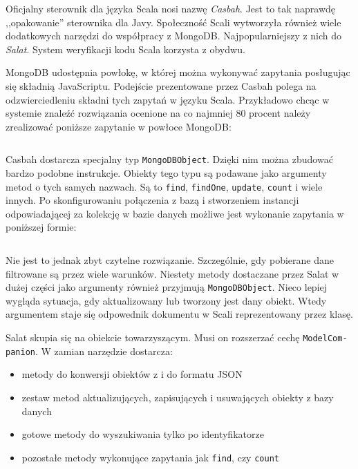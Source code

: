 \documentclass[wimgr]{xmgr}
\begin{document}
Oficjalny sterownik dla języka Scala nosi nazwę \emph{Casbah}. Jest to tak naprawdę ,,opakowanie'' sterownika dla Javy. Społeczność Scali wytworzyła również wiele dodatkowych narzędzi do współpracy z MongoDB. Najpopularniejszy z nich do \emph{Salat}. System weryfikacji kodu Scala korzysta z obydwu.

MongoDB udostępnia powłokę, w której można wykonywać zapytania posługując się składnią JavaScriptu. Podejście prezentowane przez Casbah polega na odzwierciedleniu składni tych zapytań w języku Scala.  
Przykładowo chcąc w systemie znaleźć rozwiązania ocenione na co najmniej 80 procent należy zrealizować poniższe zapytanie w powłoce MongoDB:

\inputminted[fontsize=\small]{javascript}{code/mongoFind.js}

Casbah dostarcza specjalny typ \texttt{MongoDBObject}. Dzięki nim można zbudować bardzo podobne instrukcje. Obiekty tego typu są podawane jako argumenty metod o tych samych nazwach. Są to \texttt{find}, \texttt{findOne}, \texttt{update}, \texttt{count} i wiele innych. Po skonfigurowaniu połączenia z bazą i stworzeniem instancji odpowiadającej za kolekcję w bazie danych możliwe jest wykonanie zapytania w poniższej formie:

\inputminted[fontsize=\small]{scala}{code/casbahFind.scala} 

Nie jest to jednak zbyt czytelne rozwiązanie. Szczególnie, gdy pobierane dane filtrowane są przez wiele warunków. Niestety metody dostaczane przez Salat w dużej części jako argumenty również przyjmują \texttt{MongoDBObject}. Nieco lepiej wygląda sytuacja, gdy aktualizowany lub tworzony jest dany obiekt. Wtedy argumentem staje się odpowednik dokumentu w Scali reprezentowany przez klasę.

Salat skupia się na obiekcie towarzyszącym. Musi on rozszerzać cechę \texttt{ModelCom-\newline panion}. W zamian narzędzie dostarcza:

\begin{itemize}
\item metody do konwersji obiektów z i do formatu JSON
\item zestaw metod aktualizujących, zapisujących i usuwających obiekty z bazy danych
\item gotowe metody do wyszukiwania tylko po identyfikatorze
\item pozostałe metody wykonujące zapytania jak \texttt{find}, czy \texttt{count}
\end{itemize}
\end{document}
